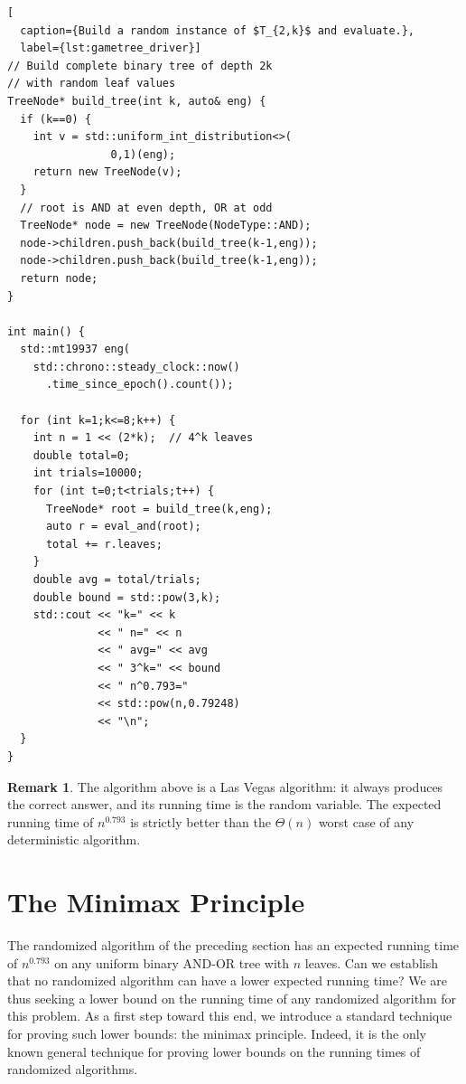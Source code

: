 \documentclass[twoside,12pt]{book}
\theoremstyle{plain}
\theoremstyle{definition}
\newtheorem{remark}[theorem]{Remark}
\theoremstyle{remark}
\begin{document}
\begin{lstlisting}[
  caption={Build a random instance of $T_{2,k}$ and evaluate.},
  label={lst:gametree_driver}]
// Build complete binary tree of depth 2k
// with random leaf values
TreeNode* build_tree(int k, auto& eng) {
  if (k==0) {
    int v = std::uniform_int_distribution<>(
                0,1)(eng);
    return new TreeNode(v);
  }
  // root is AND at even depth, OR at odd
  TreeNode* node = new TreeNode(NodeType::AND);
  node->children.push_back(build_tree(k-1,eng));
  node->children.push_back(build_tree(k-1,eng));
  return node;
}

int main() {
  std::mt19937 eng(
    std::chrono::steady_clock::now()
      .time_since_epoch().count());

  for (int k=1;k<=8;k++) {
    int n = 1 << (2*k);  // 4^k leaves
    double total=0;
    int trials=10000;
    for (int t=0;t<trials;t++) {
      TreeNode* root = build_tree(k,eng);
      auto r = eval_and(root);
      total += r.leaves;
    }
    double avg = total/trials;
    double bound = std::pow(3,k);
    std::cout << "k=" << k
              << " n=" << n
              << " avg=" << avg
              << " 3^k=" << bound
              << " n^0.793="
              << std::pow(n,0.79248)
              << "\n";
  }
}
\end{lstlisting}

\begin{remark}
The algorithm above is a Las Vegas algorithm: it always produces the correct
answer, and its running time is the random variable.  The expected running
time of $n^{0.793}$ is strictly better than the $\Theta(n)$ worst case of any
deterministic algorithm.
\end{remark}

\section{The Minimax Principle}
\label{sec:minimax}

The randomized algorithm of the preceding section has an expected running
time of $n^{0.793}$ on any uniform binary AND-OR tree with $n$ leaves.  Can
we establish that no randomized algorithm can have a lower expected running
time?  We are thus seeking a lower bound on the running time of any
randomized algorithm for this problem.  As a first step toward this end, we
introduce a standard technique for proving such lower bounds: the minimax
principle.  Indeed, it is the only known general technique for proving lower
bounds on the running times of randomized algorithms.
\end{document}
